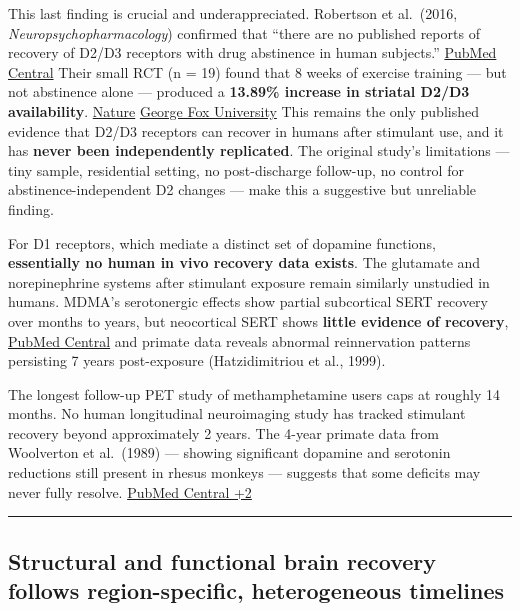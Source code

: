 This last finding is crucial and underappreciated. Robertson et al.~(2016, \emph{Neuropsychopharmacology}) confirmed that ``there are no published reports of recovery of D2/D3 receptors with drug abstinence in human subjects.'' \href{https://pmc.ncbi.nlm.nih.gov/articles/PMC4832026/}{PubMed Central} Their small RCT (n = 19) found that 8 weeks of exercise training --- but not abstinence alone --- produced a \textbf{13.89\% increase in striatal D2/D3 availability}. \href{https://www.nature.com/articles/npp2015331}{Nature} \href{https://digitalcommons.georgefox.edu/cgi/viewcontent.cgi?article=1049&context=dmsc}{George Fox University} This remains the only published evidence that D2/D3 receptors can recover in humans after stimulant use, and it has \textbf{never been independently replicated}. The original study's limitations --- tiny sample, residential setting, no post-discharge follow-up, no control for abstinence-independent D2 changes --- make this a suggestive but unreliable finding.

For D1 receptors, which mediate a distinct set of dopamine functions, \textbf{essentially no human in vivo recovery data exists}. The glutamate and norepinephrine systems after stimulant exposure remain similarly unstudied in humans. MDMA's serotonergic effects show partial subcortical SERT recovery over months to years, but neocortical SERT shows \textbf{little evidence of recovery}, \href{https://pmc.ncbi.nlm.nih.gov/articles/PMC3521982/}{PubMed Central} and primate data reveals abnormal reinnervation patterns persisting 7 years post-exposure (Hatzidimitriou et al., 1999).

The longest follow-up PET study of methamphetamine users caps at roughly 14 months. No human longitudinal neuroimaging study has tracked stimulant recovery beyond approximately 2 years. The 4-year primate data from Woolverton et al.~(1989) --- showing significant dopamine and serotonin reductions still present in rhesus monkeys --- suggests that some deficits may never fully resolve. \href{https://pmc.ncbi.nlm.nih.gov/articles/PMC3261322/}{PubMed Central +2}

\begin{center}\rule{0.5\linewidth}{0.5pt}\end{center}

\subsection{Structural and functional brain recovery follows region-specific, heterogeneous timelines}\label{14_what_we_dont_know-structural-and-functional-brain-recovery-follows-region-specific-heterogeneous-timelines}

